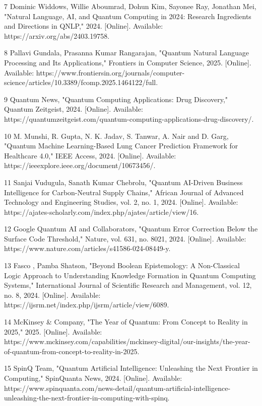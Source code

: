 \documentclass[11pt,a4paper,oneside]{report}
\begin{document}
\begin{thebibliography}{}
		\item[7] Dominic Widdows, Willie Aboumrad, Dohun Kim, Sayonee Ray, Jonathan Mei, "Natural Language, AI, and Quantum Computing in 2024: Research Ingredients and Directions in QNLP," 2024. [Online]. Available: https://arxiv.org/abs/2403.19758.  
		
		\item[8] Pallavi Gundala, Prasanna Kumar Rangarajan, "Quantum Natural Language Processing and Its Applications," Frontiers in Computer Science, 2025. [Online]. Available: https://www.frontiersin.org/journals/computer-science/articles/10.3389/fcomp.2025.1464122/full.  
		
		\item[9] Quantum News, "Quantum Computing Applications: Drug Discovery," Quantum Zeitgeist, 2024. [Online]. Available: https://quantumzeitgeist.com/quantum-computing-applications-drug-discovery/.  
		
		\item[10] M. Munshi, R. Gupta, N. K. Jadav, S. Tanwar, A. Nair and D. Garg, "Quantum Machine Learning-Based Lung Cancer Prediction Framework for Healthcare 4.0," IEEE Access, 2024. [Online]. Available: https://ieeexplore.ieee.org/document/10673456/.  
		
		\item[11] Sanjai Vudugula, Sanath Kumar Chebrolu, "Quantum AI-Driven Business Intelligence for Carbon-Neutral Supply Chains," African Journal of Advanced Technology and Engineering Studies, vol. 2, no. 1, 2024. [Online]. Available: https://ajates-scholarly.com/index.php/ajates/article/view/16.  
		
		\item[12] Google Quantum AI and Collaborators, "Quantum Error Correction Below the Surface Code Threshold," Nature, vol. 631, no. 8021, 2024. [Online]. Available: https://www.nature.com/articles/s41586-024-08449-y.  
		
		\item[13] Fasco , Pamba Shatson, "Beyond Boolean Epistemology: A Non-Classical Logic Approach to Understanding Knowledge Formation in Quantum Computing Systems," International Journal of Scientific Research and Management, vol. 12, no. 8, 2024. [Online]. Available: https://ijsrm.net/index.php/ijsrm/article/view/6089.  
		
		\item[14] McKinsey \& Company, "The Year of Quantum: From Concept to Reality in 2025," 2025. [Online]. Available: https://www.mckinsey.com/capabilities/mckinsey-digital/our-insights/the-year-of-quantum-from-concept-to-reality-in-2025.  
		
		\item[15] SpinQ Team, "Quantum Artificial Intelligence: Unleashing the Next Frontier in Computing," SpinQuanta News, 2024. [Online]. Available: https://www.spinquanta.com/news-detail/quantum-artificial-intelligence-unleashing-the-next-frontier-in-computing-with-spinq.  
	\end{thebibliography}
	
\end{document}
